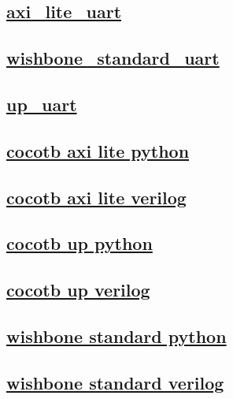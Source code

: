 \documentclass{article}
\begin{document}
  


  \subsection{\href{../files/axi_lite_uart-v.html}{axi\_lite\_uart}}

  \subsection{\href{../files/wishbone_standard_uart-v.html}{wishbone\_standard\_uart}}

  \subsection{\href{../files/up_uart-v.html}{up\_uart}}

  \subsection{\href{../files2/tb_cocotb_axi_lite-py.html}{cocotb axi lite python}}
  \subsection{\href{../files2/tb_cocotb_axi_lite-v.html}{cocotb axi lite verilog}}
  \subsection{\href{../files2/tb_cocotb_up-py.html}{cocotb up python}}
  \subsection{\href{../files2/tb_cocotb_up-v.html}{cocotb up verilog}}
  \subsection{\href{../files2/tb_cocotb_wishbone_standard-py.html}{wishbone standard python}}
  \subsection{\href{../files2/tb_cocotb_wishbone_standard-v.html}{wishbone standard verilog}}
\end{document}

